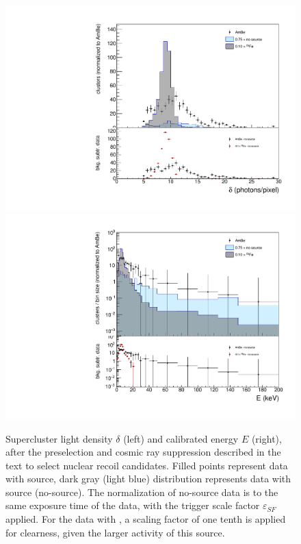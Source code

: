 \begin{figure}[ht]
  \begin{center}
  \includegraphics[width=0.45\linewidth]{figures/density_fullSel}
  \includegraphics[width=0.45\linewidth]{figures/energy_fullSel}

  \caption{Supercluster light density $\delta$ (left) and calibrated
    energy $E$ (right), after the preselection and cosmic ray
    suppression described in the text to select nuclear recoil
    candidates. Filled points represent data with \ambe source, dark
    gray (light blue) distribution represents data with \fe source
    (no-source).  The normalization of no-source data is to the same
    exposure time of the \ambe data, with the trigger scale factor
    $\varepsilon_{SF}$ applied. For the data with \fe, a scaling
    factor of one tenth is applied for clearness, given the larger
    activity of this source.  \label{fig:presel}}

  \end{center}
\end{figure}

